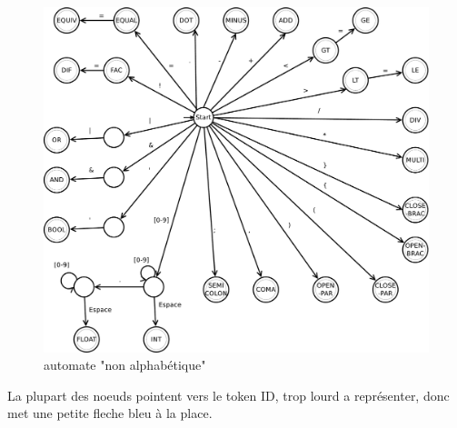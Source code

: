 \documentclass[a4paper,10pt]{article}
\begin{document}
 \begin{figure}[H] \hspace*{-2cm} 
    \centering
   	  \includegraphics[width=400pt]{automate1.pdf} 
			\caption{automate "non alphabétique"}
			\label{automate1}
  \end{figure}	
  
	La plupart des noeuds pointent vers le token ID, trop lourd a représenter, donc met une petite fleche bleu à la place.  
  
\end{document}
